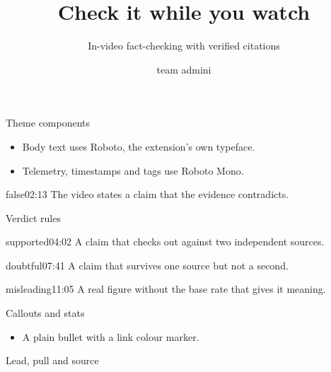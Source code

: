 \documentclass[aspectratio=169,11pt]{beamer}
\title{Check it while you watch}
\subtitle{In-video fact-checking with verified citations}
\author{team admini}
\institute{Verifact\ \textperiodcentered\ HackYeah Defence 2026}
\begin{document}
\begin{frame}
  \titlepage
\end{frame}

\begin{frame}{Theme components}
  \vspace{2mm}
  \begin{itemize}
    \item Body text uses Roboto, the extension's own typeface.
    \item Telemetry, timestamps and tags use Roboto Mono.
  \end{itemize}
  \vspace{3mm}
  \begin{claimcard}{false}{02:13}
    The video states a claim that the evidence contradicts.
    \begin{evidence}
    \end{evidence}
  \end{claimcard}
\end{frame}

\begin{frame}{Verdict rules}
  \vspace{3mm}
  \begin{claimcard}{supported}{04:02}
    A claim that checks out against two independent sources.
  \end{claimcard}
  \begin{claimcard}{doubtful}{07:41}
    A claim that survives one source but not a second.
  \end{claimcard}
  \begin{claimcard}{misleading}{11:05}
    A real figure without the base rate that gives it meaning.
  \end{claimcard}
\end{frame}

\begin{frame}{Callouts and stats}
  \begin{itemize}
    \item A plain bullet with a link colour marker.
  \end{itemize}
  \vspace{4mm}
\end{frame}

\begin{frame}{Lead, pull and source}
  \vspace{3mm}
  \vspace{3mm}
  \vspace{5mm}
\end{frame}
\end{document}
